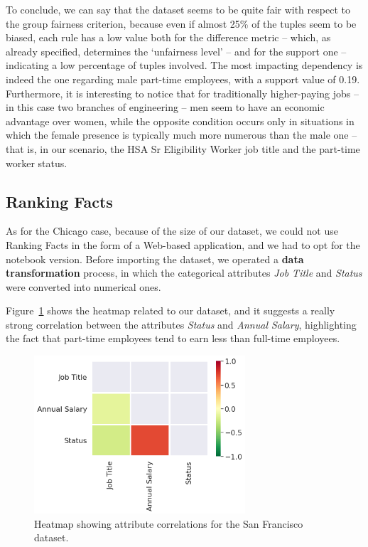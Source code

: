 To conclude, we can say that the dataset seems to be quite fair with respect to the group fairness criterion, because even if almost 25\% of the tuples seem to be biased, each rule has a low value both for the difference metric -- which, as already specified, determines the `unfairness level' -- and for the support one -- indicating a low percentage of tuples involved. The most impacting dependency is indeed the one regarding male part-time employees, with a support value of 0.19. Furthermore, it is interesting to notice that for traditionally higher-paying jobs -- in this case two branches of engineering -- men seem to have an economic advantage over women, while the opposite condition occurs only in situations in which the female presence is typically much more numerous than the male one -- that is, in our scenario, the HSA Sr Eligibility Worker job title and the part-time worker status.


\subsection{Ranking Facts}
As for the Chicago case, because of the size of our dataset, we could not use Ranking Facts in the form of a Web-based application, and we had to opt for the notebook version. Before importing the dataset, we operated a \textbf{data transformation} process, in which the categorical attributes \textit{Job Title} and \textit{Status} were converted into numerical ones.

Figure~\ref{fig:san_francisco_rankingfacts1} shows the heatmap related to our dataset, and it suggests a really strong correlation between the attributes \textit{Status} and \textit{Annual Salary}, highlighting the fact that part-time employees tend to earn less than full-time employees.

\begin{figure}[t!]
\centering
\includegraphics[width=0.7\textwidth]{figures/san_francisco_rankingfacts1.png}
\caption{Heatmap showing attribute correlations for the San Francisco dataset.}
\label{fig:san_francisco_rankingfacts1}
\end{figure}

